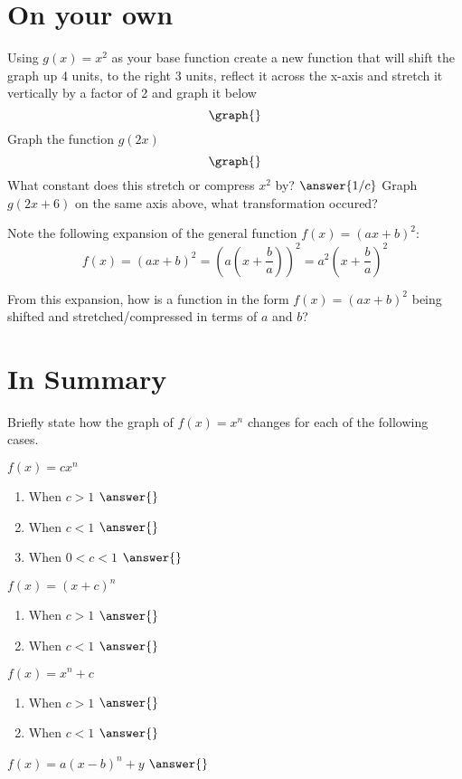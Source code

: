 \documentclass{ximera}
\begin{document}
\section{On your own}
\begin{question}
Using $g(x) = x^2$ as your base function create a new function that will shift the graph up 4 units, to the right 3 units, reflect it across the x-axis and stretch it vertically by a factor of 2 and graph it below
\[
\graph{}
\]
Graph the function $g(2x)$
\[
\graph{}
\]
What constant does this stretch or compress $x^2$ by?
$\answer{1/c}$
Graph $g(2x+6)$ on the same axis above, what transformation occured? 
\begin{freeResponse}
\end{freeResponse}
Note the following expansion of the general function $f(x)=(ax+b)^2$: $$\displaystyle f(x)=\left(ax+b\right)^2=\left(a\left(x+\frac{b}{a}\right)\right)^2=a^2\left(x+\frac{b}{a}\right)^2$$

From this expansion, how is a function in the form $f(x)=(ax+b)^2$ being shifted and stretched/compressed in terms of $a$ and $b$?

\end{question}
\section{In Summary}
Briefly state how the graph of $f(x)=x^n$ changes for each of the following cases.
\begin{question}
$f(x)=cx^n$
\begin{enumerate}
\item When $c>1$ $\answer{}$
\item When $c<1$ $\answer{}$
\item When $0<c<1$ $\answer{}$
\end{enumerate}
$f(x)=(x+c)^n$
\begin{enumerate}
\item When $c>1$ $\answer{}$
\item When $c<1$ $\answer{}$
\end{enumerate}
$f(x)=x^n+c$
\begin{enumerate}
\item When $c>1$ $\answer{}$
\item When $c<1$ $\answer{}$
\end{enumerate}
$f(x)=a(x-b)^n+y$ $\answer{}$
\end{question}
\end{document}
